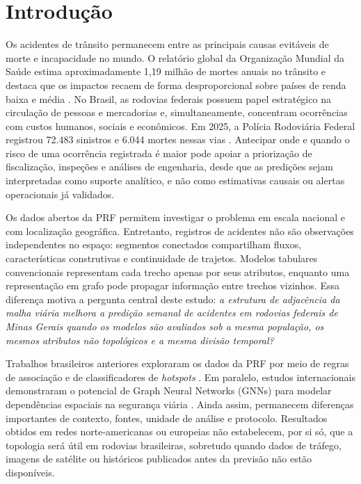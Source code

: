\documentclass[12pt]{article}
\begin{document}
\section{Introdução}
\label{sec:introducao}

Os acidentes de trânsito permanecem entre as principais causas
evitáveis de morte e incapacidade no mundo. O relatório global da
Organização Mundial da Saúde estima aproximadamente 1,19 milhão de
mortes anuais no trânsito e destaca que os impactos recaem de forma
desproporcional sobre países de renda baixa e média
\cite{who2023}. No Brasil, as rodovias federais possuem papel
estratégico na circulação de pessoas e mercadorias e, simultaneamente,
concentram ocorrências com custos humanos, sociais e econômicos. Em
2025, a Polícia Rodoviária Federal registrou 72.483 sinistros e 6.044
mortes nessas vias \cite{prf2026}. Antecipar onde e quando o risco de
uma ocorrência registrada é maior pode apoiar a priorização de
fiscalização, inspeções e análises de engenharia, desde que as
predições sejam interpretadas como suporte analítico, e não como
estimativas causais ou alertas operacionais já validados.

Os dados abertos da PRF permitem investigar o problema em escala
nacional e com localização geográfica. Entretanto, registros de
acidentes não são observações independentes no espaço: segmentos
conectados compartilham fluxos, características construtivas e
continuidade de trajetos. Modelos tabulares convencionais representam
cada trecho apenas por seus atributos, enquanto uma representação em
grafo pode propagar informação entre trechos vizinhos. Essa diferença
motiva a pergunta central deste estudo: \textit{a estrutura de
adjacência da malha viária melhora a predição semanal de acidentes em
rodovias federais de Minas Gerais quando os modelos são avaliados sob a
mesma população, os mesmos atributos não topológicos e a mesma divisão
temporal?}

Trabalhos brasileiros anteriores exploraram os dados da PRF por meio
de regras de associação \cite{araujo2022} e de classificadores de
\textit{hotspots} \cite{amorim2023}. Em paralelo, estudos
internacionais demonstraram o potencial de Graph Neural Networks
(GNNs) para modelar dependências espaciais na segurança viária
\cite{nippani2023,zhang2026,zhuang2024}. Ainda assim, permanecem
diferenças importantes de contexto, fontes, unidade de análise e
protocolo. Resultados obtidos em redes norte-americanas ou europeias
não estabelecem, por si só, que a topologia será útil em rodovias
brasileiras, sobretudo quando dados de tráfego, imagens de satélite ou
históricos publicados antes da previsão não estão disponíveis.
\end{document}
